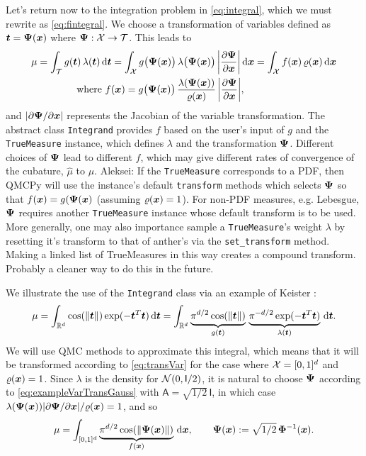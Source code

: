 \documentclass[graybox,footinfo]{svmult}
\newcommand{\QMCPYabs}[1]{\ensuremath{{\left \lvert #1 \right \rvert}}}
\newcommand{\AGSComment}[1]{{\color{cyan} Aleksei: #1}}
\newcommand{\hmu}{\widehat{\mu}}
\newcommand{\mA}{\mathsf{A}}
\newcommand{\mI}{\mathsf{I}}
\begin{document}
Let's return now to the integration problem in \eqref{eq:integral}, which we must rewrite as \eqref{eq:fintegral}.  We choose a transformation of variables defined as ${\boldsymbol{t}} = {\boldsymbol{\Psi}}({\boldsymbol{x}})$ where ${\boldsymbol{\Psi}}:{\mathcal{X}} \to {\mathcal{T}}$.  This leads to 
\begin{align}
	\nonumber 
 \mu &= \int_\calT g(\bst) \, \lambda(\bst) \, \D \bst  = \int_\calX g\bigl(\bsPsi(\bsx)\bigr) \, \lambda\bigl(\bsPsi(\bsx)\bigr) \,\QMCPYabs{\frac{\partial \bsPsi}{\partial \bsx}} \, \D \bsx =  \int_\calX f(\bsx) \, \varrho(\bsx) \, \D \bsx  \\
 \label{eq:transVar}
  & \qquad \qquad \text{where } f(\bsx)  = g\bigl(\bsPsi(\bsx)\bigr)  \, \frac{\lambda(\bsPsi(\bsx))}{\varrho(\bsx)} \,\QMCPYabs{\frac{\partial \bsPsi}{\partial \bsx}},
\end{align}
and $\QMCPYabs{\partial \bsPsi/\partial \bsx}$ represents the Jacobian of the variable transformation.  The abstract class \texttt{Integrand} provides $f$ based on the user's input of $g$ and the \texttt{TrueMeasure} instance, which defines $\lambda$ and the transformation ${\boldsymbol{\Psi}}$. Different choices of ${\boldsymbol{\Psi}}$ lead to different $f$, which may give different rates of convergence of the cubature, $\hmu$ to $\mu$.
\AGSComment{If the \texttt{TrueMeasure} corresponds to a PDF, then QMCPy will use the instance's default \texttt{transform} methods which selects ${\boldsymbol{\Psi}}$ so that $f({\boldsymbol{x}})=g({\boldsymbol{\Psi}}({\boldsymbol{x}})$ (assuming $\varrho({\boldsymbol{x}})=1$). For non-PDF measures, e.g. Lebesgue, ${\boldsymbol{\Psi}}$ requires another \texttt{TrueMeasure} instance whose default transform is to be used. More generally, one may also importance sample a \texttt{TrueMeasure}'s weight $\lambda$ by resetting it's transform to that of anther's via the \texttt{set\_transform} method. Making a linked list of TrueMeasures in this way creates a compound transform. Probably a cleaner way to do this in the future.}

We illustrate the use of the \texttt{Integrand} class via an example of Keister \cite{Kei96}:
\begin{equation} \label{eq:KeisterIntegral}
	\mu 
	= \int_{\bbR^d} \cos(\lVert \bst \rVert) \exp(-\bst^T \bst) \, \D \bst \\ 
	= \int_{\bbR^d} \underbrace{\pi^{d/2} \cos(\lVert \bst \rVert)}_{g(\bst)}\, \underbrace{\pi^{-d/2} \exp(-\bst^T \bst) }_{\lambda(\bst)} \, \D \bst.
\end{equation}
We will use QMC methods to approximate this integral, which means that it will be transformed according to \eqref{eq:transVar} for the case where ${\mathcal{X}} = [0,1]^d$ and $\varrho({\boldsymbol{x}}) = 1$.  Since $\lambda$ is the density for $\calN(0,\mI/2)$, it is natural to choose ${\boldsymbol{\Psi}}$ according to \eqref{eq:exampleVarTransGauss} with $\mA = \sqrt{1/2} \, \mI$, in which case $\lambda(\bsPsi(\bsx)) \QMCPYabs{\partial \bsPsi/\partial \bsx} / \varrho(\bsx) = 1$, and so 
\[
\mu = \int_{[0,1]^d} \underbrace{\pi^{d/2} \cos(\lVert {\boldsymbol{\Psi}}({\boldsymbol{x}}) \rVert)}_{f({\boldsymbol{x}})} \, \mathrm{d} {\boldsymbol{x}}, \qquad 
{\boldsymbol{\Psi}}({\boldsymbol{x}}) := \sqrt{1/2} \,{\boldsymbol{\Phi}}^{-1}({\boldsymbol{x}}).
\]
\end{document}
